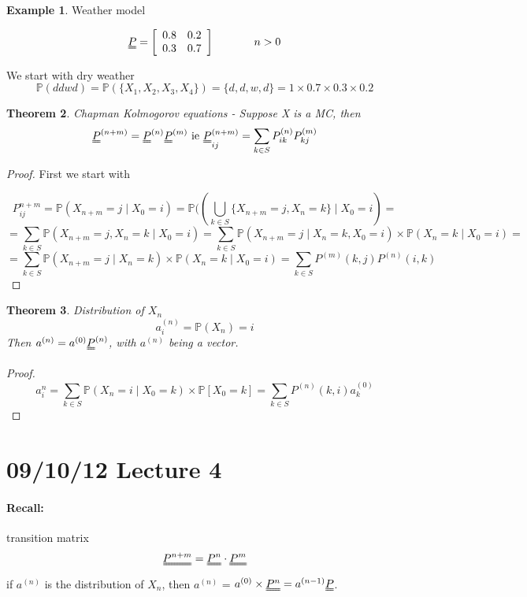 \documentclass{article}
\newtheorem{thm}{Theorem}
\theoremstyle{definition}
\newtheorem{ex}[thm]{Example}
\begin{document}
\begin{ex} Weather model

\[
\uuline{P} = \left [ \begin{array}{cc} 0.8 & 0.2 \\ 0.3 & 0.7 \end{array} \right ] \hspace*{0.5 in} n > 0
\]

We start with dry weather 
\[
\mathbb{P}(ddwd) = \mathbb{P}(\{X_1, X_2, X_3,X_4\} ) = \{d,d,w,d\} = 1 \times 0.7 \times 0.3 \times 0.2
\] 
\end{ex}

\begin{thm} Chapman Kolmogorov equations -
Suppose X is a MC, then
\[
\uuline{P}^{(n + m)} = \uuline{P}^{(n)} \uuline{P}^{(m)} \mbox{ ie } \uuline{P}_{ij}^{(n+m)} = \sum_{k \in S} P_{ik}^{(n)} P_{kj}^{(m)}
\]
\end{thm}

\begin{proof} First we start with

\[
P_{ij}^{n+m} = \mathbb{P}(X_{n+m} = j \mid X_0 = i )= \mathbb{P}((\bigcup_{k \in S} \{ X_{n+m} = j, X_n = k \} \mid X_0 = i) =
\]
\[ = \sum_{k \in S} \mathbb{P}(X_{n+m} = j, X_n = k \mid X_0 = i) = \sum_{k \in S} \mathbb{P}(X_{n+m} = j \mid X_n = k, X_0 = i ) \times \mathbb{P} (X_n = k \mid X_0 = i) = 
\]
\[ = \sum_{k \in S} \mathbb{P} (X_{n+m} = j \mid X_n = k) \times \mathbb{P}(X_n = k \mid X_0 = i) = \sum_{k \in S} P^{(m)}(k,j) P^{(n)}(i,k)
\]
\end{proof}

\begin{thm} Distribution of $X_n$
\[
a_i^{(n)} = \mathbb{P}(X_n) = i
\]
Then $a^{(n)} = a^{(0)} \uuline{P}^{(n)}$, with $a^{(n)}$ being a vector.
\end{thm}

\begin{proof}
\[
a_i^n = \sum_{k \in S} \mathbb{P} (X_n = i \mid X_0 = k ) \times \mathbb{P}[X_0 = k] = \sum_{k \in S} P^{(n)} (k,i) a_k^{(0)}
\] 
\end{proof}

\section{09/10/12 Lecture 4}

\paragraph*{Recall:} transition matrix
\[
\uuline{P^{n+m}} = \uuline{P^{n}} \cdot \uuline{P^{m}} 
\]
if $a^{(n)}$ is the distribution of $X_n$, then $a^{(n)}$ = $a^{(0)} \times \uuline{P^{n}} = a^{(n-1)}\uuline{P}$.
\end{document}
